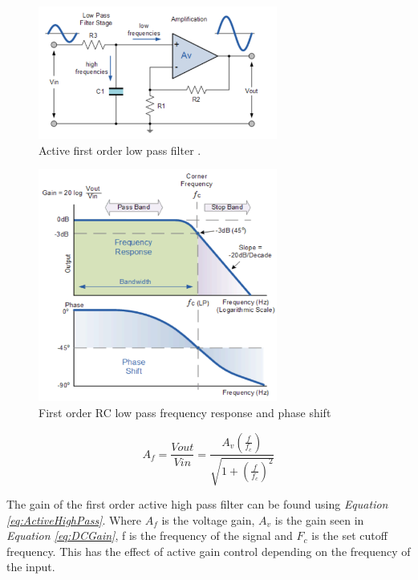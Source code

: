 \begin{figure}[h]
    \centering
    \includegraphics[width=0.70\textwidth]{graphics/lowPassFilter.png}
    \caption{Active first order low pass filter \cite{noauthor_active_2013-1}.}
    \label{fig:LowPassFilter}
\end{figure}

\begin{figure}[h]
    \centering
    \includegraphics[width=0.70\textwidth]{graphics/lowPassResponse.png}
    \caption{First order RC low pass frequency response and phase shift \cite{noauthor_low_2013}}
    \label{fig:LowPassResponse}
\end{figure}


\begin{equation}
    A_f = \frac{V{out}}{V{in}} = \frac{A_v(\frac{f}{f_c})}{\sqrt{1 + (\frac{f}{f_c})^2}}
    \label{eq:ActiveHighPass}
\end{equation}

The gain of the first order active high pass filter can be found using \textit{Equation \ref{eq:ActiveHighPass}}.
Where $A_f$ is the voltage gain, $A_v$ is the gain seen in \textit{Equation \ref{eq:DCGain}}, f is the frequency of the signal and $F_c$ is the set cutoff frequency.
This has the effect of active gain control depending on the frequency of the input.

